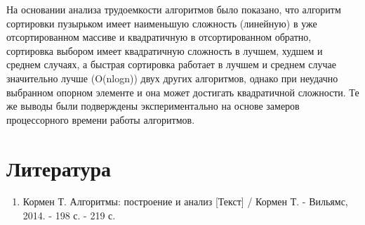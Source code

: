 \documentclass{report}
\begin{document}
На основании анализа трудоемкости алгоритмов было показано, что алгоритм сортировки пузырьком имеет наименьшую сложность (линейную) в уже отсортированном массиве и квадратичную в отсортированном обратно, сортировка выбором имеет квадратичную сложность в лучшем, худшем и среднем случаях, а быстрая сортировка работает в лучшем и среднем случае значительно лучше (O(nlogn)) двух других алгоритмов, однако при неудачно выбранном опорном элементе и она может достигать квадратичной сложности. Те же выводы были подверждены экспериментально на основе замеров процессорного времени работы алгоритмов. 

\chapter*{Литература}
\begin{enumerate}
	\item Кормен Т. Алгоритмы: построение и анализ [Текст] / Кормен Т. - Вильямс, 2014. - 198 с. - 219 с.
\end{enumerate}
\end{document}
